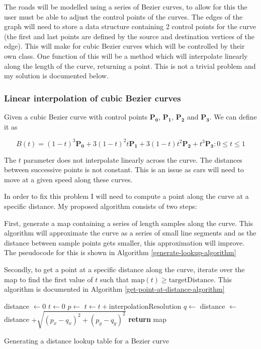     The roads will be modelled using a series of Bezier curves, to allow for this the user must be able to adjust the control points of the curves. The edges of the graph will need to store a data structure containing 2 control points for the curve (the first and last points are defined by the source and destination vertices of the edge). This will make for cubic Bezier curves which will be controlled by their own  class. One function of this will be a  method which will interpolate linearly along the length of the curve, returning a point. This is not a trivial problem and my solution is documented below.

    \subsubsection{Linear interpolation of cubic Bezier curves}

    Given a cubic Bezier curve with control points $\mathbf{P_0}$, $\mathbf{P_1}$, $\mathbf{P_2}$ and $\mathbf{P_3}$. We can define it as

    \[B(t) = (1 - t)^3\mathbf{P_0} + 3(1 - t)^2t\mathbf{P_1} + 3(1 - t)t^2\mathbf{P_2} + t^3\mathbf{P_3} : 0 \leq t \leq 1\]

    The $t$ parameter does not interpolate linearly across the curve. The distances between successive points is not constant. This is an issue as cars will need to move at a given speed along these curves.

    In order to fix this problem I will need to compute a point along the curve at a specific distance. My proposed algorithm consists of two steps:

    First, generate a map containing a series of length samples along the curve. This algorithm will approximate the curve as a series of small line segments and as the distance between sample points gets smaller, this approximation will improve. The pseudocode for this is shown in Algorithm \ref{generate-lookup-algorithm}

    Secondly, to get a point at a specific distance along the curve, iterate over the map to find the first value of $t$ such that $\text{map}(t) \geq \text{targetDistance}$. This algorithm is documented in Algorithm \ref{get-point-at-distance-algorithm}

    \begin{algorithm}
        \begin{algorithmic}
            \State distance $\gets 0$
            \State $t \gets 0$
                \State {}
                \State $p \gets$ 
                \State $t \gets t + \text{interpolationResolution}$
                \State $q \gets$ 
                \State distance $\gets$ distance $+ \sqrt{(p_x - q_x)^2 + (p_y - q_y)^2}$
            \EndWhile
            \State \textbf{return} map
        \end{algorithmic}
        \caption{Generating a distance lookup table for a Bezier curve}
        \label{generate-lookup-algorithm}
    \end{algorithm}

